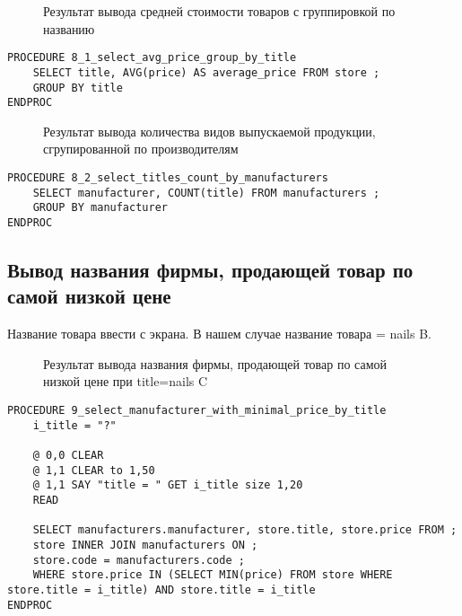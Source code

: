 \begin{figure}[h!t]
    \caption{Результат вывода средней стоимости товаров с группировкой по названию}
\end{figure}

\begin{lstlisting}[float,caption=Source code]
PROCEDURE 8_1_select_avg_price_group_by_title
	SELECT title, AVG(price) AS average_price FROM store ;
	GROUP BY title
ENDPROC
\end{lstlisting}


\begin{figure}[h!t]
  \caption{Результат вывода количества видов выпускаемой продукции, сгрупированной по производителям}
\end{figure}

\begin{lstlisting}[float,caption=Source code]
PROCEDURE 8_2_select_titles_count_by_manufacturers
	SELECT manufacturer, COUNT(title) FROM manufacturers ;
	GROUP BY manufacturer
ENDPROC
\end{lstlisting}

\subsection{Вывод названия фирмы, продающей товар по самой низкой цене}

Название товара ввести с экрана. В нашем случае название товара = nails B.
\begin{figure}[h!t]
  \caption{Результат вывода названия фирмы, продающей товар по самой низкой цене при title=nails C}
\end{figure}

\begin{lstlisting}[float,caption=Source code]
PROCEDURE 9_select_manufacturer_with_minimal_price_by_title
	i_title = "?"

	@ 0,0 CLEAR
	@ 1,1 CLEAR to 1,50
	@ 1,1 SAY "title = " GET i_title size 1,20
	READ
	
	SELECT manufacturers.manufacturer, store.title, store.price FROM ;
	store INNER JOIN manufacturers ON ;
	store.code = manufacturers.code ;
	WHERE store.price IN (SELECT MIN(price) FROM store WHERE store.title = i_title) AND store.title = i_title
ENDPROC
\end{lstlisting}

